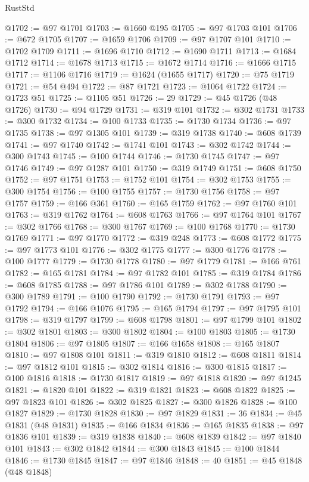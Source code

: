 \begin{lexlean}{RustStd}
\begin{coremodule}
@1702 := @97 @1701
@1703 := @1660 @195
@1705 := @97 @1703 @101
@1706 := @672 @1705
@1707 := @1659 @1706
@1709 := @97 @1707 @101
@1710 := @1702 @1709
@1711 := @1696 @1710
@1712 := @1690 @1711
@1713 := @1684 @1712
@1714 := @1678 @1713
@1715 := @1672 @1714
@1716 := @1666 @1715
@1717 := @1106 @1716
@1719 := @1624 (@1655 @1717)
@1720 := @75 @1719
@1721 := @54 @494
@1722 := @87 @1721
@1723 := @1064 @1722
@1724 := @1723 @51
@1725 := @1105 @51
@1726 := 29
@1729 := @45 @1726 (@48 @1726)
@1730 := @94 @1729
@1731 := @319 @101
@1732 := @302 @1731
@1733 := @300 @1732
@1734 := @100 @1733
@1735 := @1730 @1734
@1736 := @97 @1735
@1738 := @97 @1305 @101
@1739 := @319 @1738
@1740 := @608 @1739
@1741 := @97 @1740
@1742 := @1741 @101
@1743 := @302 @1742
@1744 := @300 @1743
@1745 := @100 @1744
@1746 := @1730 @1745
@1747 := @97 @1746
@1749 := @97 @1287 @101
@1750 := @319 @1749
@1751 := @608 @1750
@1752 := @97 @1751
@1753 := @1752 @101
@1754 := @302 @1753
@1755 := @300 @1754
@1756 := @100 @1755
@1757 := @1730 @1756
@1758 := @97 @1757
@1759 := @166 @361
@1760 := @165 @1759
@1762 := @97 @1760 @101
@1763 := @319 @1762
@1764 := @608 @1763
@1766 := @97 @1764 @101
@1767 := @302 @1766
@1768 := @300 @1767
@1769 := @100 @1768
@1770 := @1730 @1769
@1771 := @97 @1770
@1772 := @319 @248
@1773 := @608 @1772
@1775 := @97 @1773 @101
@1776 := @302 @1775
@1777 := @300 @1776
@1778 := @100 @1777
@1779 := @1730 @1778
@1780 := @97 @1779
@1781 := @166 @761
@1782 := @165 @1781
@1784 := @97 @1782 @101
@1785 := @319 @1784
@1786 := @608 @1785
@1788 := @97 @1786 @101
@1789 := @302 @1788
@1790 := @300 @1789
@1791 := @100 @1790
@1792 := @1730 @1791
@1793 := @97 @1792
@1794 := @166 @1076
@1795 := @165 @1794
@1797 := @97 @1795 @101
@1798 := @319 @1797
@1799 := @608 @1798
@1801 := @97 @1799 @101
@1802 := @302 @1801
@1803 := @300 @1802
@1804 := @100 @1803
@1805 := @1730 @1804
@1806 := @97 @1805
@1807 := @166 @1658
@1808 := @165 @1807
@1810 := @97 @1808 @101
@1811 := @319 @1810
@1812 := @608 @1811
@1814 := @97 @1812 @101
@1815 := @302 @1814
@1816 := @300 @1815
@1817 := @100 @1816
@1818 := @1730 @1817
@1819 := @97 @1818
@1820 := @97 @1245
@1821 := @1820 @101
@1822 := @319 @1821
@1823 := @608 @1822
@1825 := @97 @1823 @101
@1826 := @302 @1825
@1827 := @300 @1826
@1828 := @100 @1827
@1829 := @1730 @1828
@1830 := @97 @1829
@1831 := 36
@1834 := @45 @1831 (@48 @1831)
@1835 := @166 @1834
@1836 := @165 @1835
@1838 := @97 @1836 @101
@1839 := @319 @1838
@1840 := @608 @1839
@1842 := @97 @1840 @101
@1843 := @302 @1842
@1844 := @300 @1843
@1845 := @100 @1844
@1846 := @1730 @1845
@1847 := @97 @1846
@1848 := 40
@1851 := @45 @1848 (@48 @1848)

\end{coremodule}
\end{lexlean}
